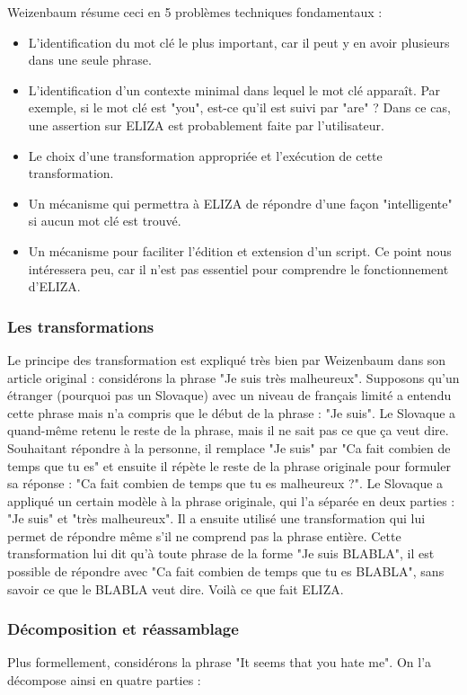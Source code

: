 \documentclass[11pt, a4paper]{report}
\begin{document}
Weizenbaum résume ceci en 5 problèmes techniques fondamentaux :
\begin{itemize}
  \item L'identification du mot clé le plus important, car il peut y en avoir plusieurs dans une 
  seule phrase.
  \item L'identification d'un contexte minimal dans lequel le mot clé apparaît. Par exemple, si le 
  mot clé est "you", est-ce qu'il est suivi par "are" ? Dans ce cas, une assertion sur ELIZA est 
  probablement faite par l'utilisateur.
  \item Le choix d'une transformation appropriée et l'exécution de cette transformation. 
  \item Un mécanisme qui permettra à ELIZA de répondre d'une façon "intelligente" si aucun mot 
  clé est trouvé. 
  \item Un mécanisme pour faciliter l'édition et extension d'un script. Ce point nous intéressera peu, 
  car il n'est pas essentiel pour comprendre le fonctionnement d'ELIZA. 
\end{itemize}

      \subsubsection*{Les transformations}
Le principe des transformation est expliqué très bien par Weizenbaum dans son article original : 
considérons la phrase "Je suis très malheureux". Supposons qu'un étranger (pourquoi pas un Slovaque) avec un niveau de 
français limité a entendu cette phrase mais n'a compris que le début de la phrase : "Je suis". 
Le Slovaque a quand-même retenu le reste de la phrase, mais il ne sait pas ce que ça veut dire. 
Souhaitant répondre à la personne, il remplace "Je suis" par "Ca fait combien de temps que tu es"
et ensuite il répète le reste de la phrase originale pour formuler sa réponse :
"Ca fait combien de temps que tu es malheureux ?". Le Slovaque a appliqué un certain modèle
à la phrase originale, qui l'a séparée en deux parties : "Je suis" et "très malheureux".
Il a ensuite utilisé une transformation qui lui permet de répondre même s'il ne comprend pas 
la phrase entière. Cette transformation lui dit qu'à toute phrase de la forme 
"Je suis BLABLA", il est possible de répondre avec "Ca fait combien de temps que tu es BLABLA", 
sans savoir ce que le BLABLA veut dire. Voilà ce que fait ELIZA.  

      \subsubsection*{Décomposition et réassamblage}
Plus formellement, considérons la phrase "It seems that you hate me". On l'a décompose ainsi
en quatre parties :
\end{document}
